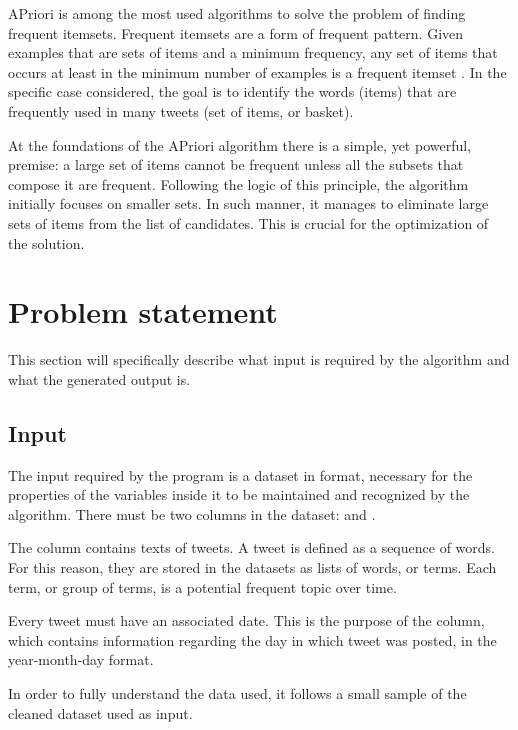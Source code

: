APriori is among the most used algorithms to solve the problem of finding frequent itemsets. Frequent itemsets are a form of frequent pattern. Given examples that are sets of items and a minimum frequency, any set of items that occurs at least in the minimum number of examples is a frequent itemset \cite{Toivonen2010}. In the specific case considered, the goal is to identify the words (items) that are frequently used in many tweets (set of items, or basket).

At the foundations of the APriori algorithm there is a simple, yet powerful, premise: a large set of items cannot be frequent unless all the subsets that compose it are frequent. Following the logic of this principle, the algorithm initially focuses on smaller sets. In such manner, it manages to eliminate large sets of items from the list of candidates. This is crucial for the optimization of the solution.


\section{Problem statement}\label{sect_probl_stat}

This section will specifically describe what input is required by the algorithm and what the generated output is.

\subsection*{Input}

The input required by the program is a dataset in  format, necessary for the properties of the variables inside it to be maintained and recognized by the algorithm. There must be two columns in the dataset:  and .

The  column contains texts of tweets. A tweet is defined as a sequence of words. For this reason, they are stored in the datasets as lists of words, or terms. Each term, or group of terms, is a potential frequent topic over time.

Every tweet must have an associated date. This is the purpose of the  column, which contains information regarding the day in which tweet was posted, in the year-month-day format.

In order to fully understand the data used, it follows a small sample of the cleaned dataset used as input.

